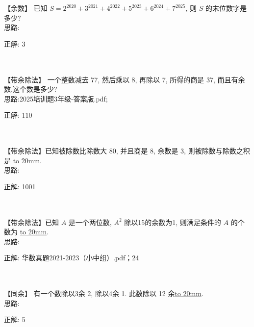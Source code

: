 \item {
    【余数】
    已知 $S = 2^{2020} + 3^{2021} + 4^{2022} + 5^{2023} +6^{2024} + 7^{2025}$, 则 $S$ 的末位数字是多少? 
    \ifshowSolution
        \fangsong{}
        \\
        思路:

        正解: 3
    \else
        \\ \\ \\
    \fi
}

\item {
    【带余除法】
    一个整数减去 77, 然后乘以 8, 再除以 7, 所得的商是 37, 而且有余数.这个数是多少? 
    \ifshowSolution
        \fangsong{}
        \\
        思路:2025培训题3年级-答案版.pdf;

        正解:  110
    \else
        \\ \\ \\
    \fi
}

\item {
    【带余除法】已知被除数比除数大 80, 并且商是 8, 余数是 3, 则被除数与除数之积是 \underline{\hbox to 20mm{}}.
    \ifshowSolution
        \fangsong{}
        \\
        思路:

        正解: 1001
    \else
        \\ \\ \\
    \fi
}

\item {
    【带余除法】已知 $A$ 是一个两位数, $A^2$ 除以15的余数为1, 则满足条件的 $A$ 的个数为 \underline{\hbox to 20mm{}}.
    \ifshowSolution
        \fangsong{}
        \\
        思路:

        正解: 华数真题2021-2023（小中组）.pdf；24
    \else
        \\ \\ \\
    \fi
}

\item {
    【同余】
    有一个数除以3余 2, 除以4余 1. 此数除以 12 余\underline{\hbox to 20mm{}}.
    \ifshowSolution
        \fangsong{}
        \\
        思路:

        正解: 5
    \else
        \\ \\ \\
    \fi
}

